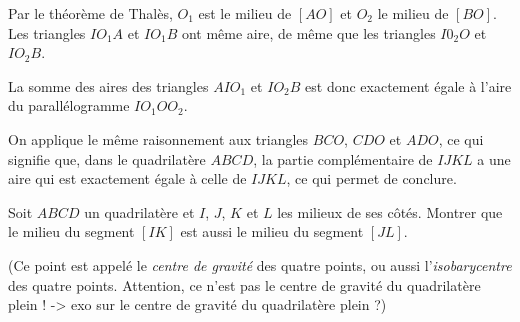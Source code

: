 \begin{exo}
\begin{sol}
\begin{enumerate}
Par le théorème de Thalès,  $O_1$ est le milieu de $[AO]$ et $O_2$ le milieu de $[BO]$. Les triangles $IO_1A$ et $IO_1B$ ont même aire, de même que les triangles $I0_2O$ et $IO_2B$.

La somme des aires des triangles $AIO_1$ et $IO_2B$ est donc exactement \'egale \`a l'aire du parallélogramme $IO_1OO_2$. 
 
On applique le même raisonnement aux triangles $BCO$, $CDO$ et $ADO$, ce qui signifie que, dans le quadrilatère $ABCD$, la partie compl\'ementaire de $IJKL$ a une aire qui est exactement \'egale \`a celle de $IJKL$, ce qui permet de conclure. \end{enumerate}

\end{sol}
\end{exo}



\begin{exo}
Soit $ABCD$ un quadrilatère et $I$, $J$, $K$ et $L$ les milieux de ses côtés.
Montrer que le milieu du segment $[IK]$ est aussi le milieu du segment $[JL]$.

(Ce point est appelé le \emph{centre de gravité} des quatre points, ou aussi l'\emph{isobarycentre} des quatre points. Attention, ce n'est pas le centre de gravité du quadrilatère plein ! -> exo sur le centre de gravité du quadrilatère plein ?)
\begin{center}
\def\isobarycentre{
\tkzDefPoints{0/0/A, 5/0/B, 4/4/C, 1/3/D}
\tkzDefMidPoint(A,B)\tkzGetPoint{I}
\tkzDefMidPoint(B,C)\tkzGetPoint{J}
\tkzDefMidPoint(C,D)\tkzGetPoint{K}
\tkzDefMidPoint(D,A)\tkzGetPoint{L}
\tkzDefMidPoint(I,K)\tkzGetPoint{O}
\tkzDrawPolygon(A,B,C,D)
\tkzDrawPoints(A,B,C,D,I,J,K,L,O)
\tkzMarkSegments[mark=|||](A,I I,B)
\tkzMarkSegments[mark=||](B,J J,C)
\tkzMarkSegments[mark=|](C,K K,D)
\tkzMarkSegments[mark=s](D,L L,A)
\tkzAutoLabelPoints[center=O](A,B,C,D,I,J,K,L)
}
\hspace{1cm}
\end{center}
\end{exo}



